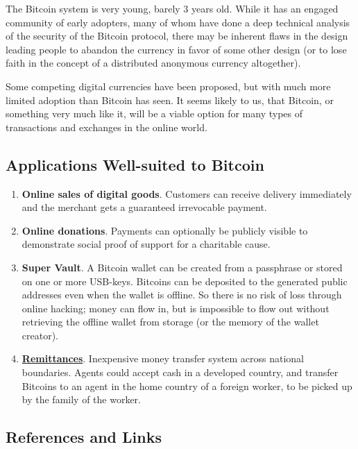 \documentclass[12pt,twocolumn]{article}
\begin{document}
The Bitcoin system is very young, barely 3 years old. While it has an
engaged community of early adopters, many of whom have done a deep
technical analysis of the security of the Bitcoin protocol, there may be
inherent flaws in the design leading people to abandon the currency in
favor of some other design (or to lose faith in the concept of a
distributed anonymous currency altogether).

Some competing digital currencies have been proposed, but with much more
limited adoption than Bitcoin has seen. It seems likely to us, that
Bitcoin, or something very much like it, will be a viable option for
many types of transactions and exchanges in the online world.

\subsection{Applications Well-suited to Bitcoin}

\begin{enumerate}[1.]
\item
  \textbf{Online sales of digital goods}. Customers can receive delivery
  immediately and the merchant gets a guaranteed irrevocable payment.
\item
  \textbf{Online donations}. Payments can optionally be publicly visible
  to demonstrate social proof of support for a charitable cause.
\item
  \textbf{Super Vault}. A Bitcoin wallet can be created from a
  passphrase or stored on one or more USB-keys. Bitcoins can be
  deposited to the generated public addresses even when the wallet is
  offline. So there is no risk of loss through online hacking; money can
  flow in, but is impossible to flow out without retrieving the offline
  wallet from storage (or the memory of the wallet creator).
\item
  \textbf{\href{http://en.wikipedia.org/wiki/Remittance}{Remittances}}.
  Inexpensive money transfer system across national boundaries. Agents
  could accept cash in a developed country, and transfer Bitcoins to an
  agent in the home country of a foreign worker, to be picked up by the
  family of the worker.
\end{enumerate}
\subsection{References and Links}
\end{document}
